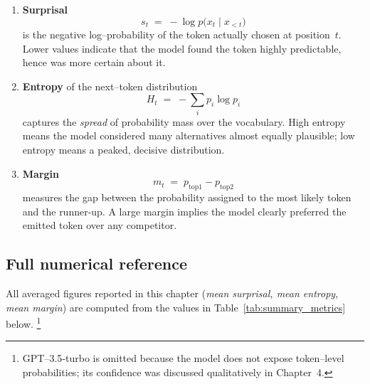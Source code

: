 \documentclass[12pt]{article}
\begin{document}
\begin{enumerate}[label=\textbf{\arabic*.}, itemsep=2pt]
    \item \textbf{Surprisal}  
          \[
             s_t \;=\; -\log p\bigl(x_t \mid x_{<t}\bigr)
          \]
          is the negative log--probability of the token actually chosen at position~$t$.  
          Lower values indicate that the model found the token highly predictable, hence was more certain about it.
    \item \textbf{Entropy} of the next--token distribution  
          \[
             H_t \;=\; -\!\sum_{i} p_i \log p_i
          \]
          captures the \emph{spread} of probability mass over the vocabulary.  
          High entropy means the model considered many alternatives almost equally plausible; low entropy means a peaked, decisive distribution.
    \item \textbf{Margin}  
          \[
             m_t \;=\; p_{\text{top1}} - p_{\text{top2}}
          \]
          measures the gap between the probability assigned to the most likely token and the runner-up.  
          A large margin implies the model clearly preferred the emitted token over any competitor.
\end{enumerate}

\subsection{Full numerical reference}
All averaged figures reported in this chapter
(\emph{mean surprisal, mean entropy, mean margin})
are computed from the values in Table~\ref{tab:summary_metrics} below.%
\footnote{GPT--3.5‐turbo is omitted because the model
does not expose token–level probabilities; its confidence was discussed qualitatively in Chapter~4.}
\end{document}
